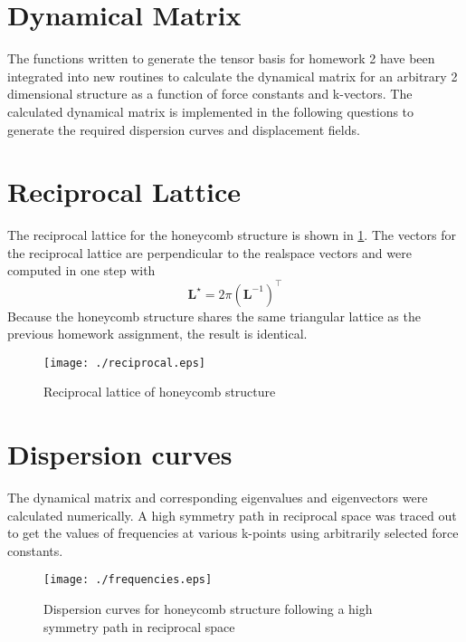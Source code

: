 \documentclass[12pt, fleqn]{article}
\begin{document}
\section{Dynamical Matrix}
The functions written to generate the tensor basis for homework 2 have been integrated into new routines to calculate the
dynamical matrix for an arbitrary 2 dimensional structure as a function of force constants and k-vectors.
The calculated dynamical matrix is implemented in the following questions to generate the required dispersion curves
and displacement fields.

\section{Reciprocal Lattice}
The reciprocal lattice for the honeycomb structure is shown in \cref{fig:reciprocal}. The vectors for the reciprocal lattice
are perpendicular to the realspace vectors and were computed in one step with
\begin{equation}
    \mathbf{L^\star}=2\pi \left( \mathbf{L}^{-1} \right)^{\intercal}
    \label{recip}
\end{equation}
Because the honeycomb structure shares the same triangular lattice as the previous homework assignment, the result is identical.

\begin{figure}[h]
    \begin{center}
        \texttt{[image: ./reciprocal.eps]}
    \end{center}
    \caption{Reciprocal lattice of honeycomb structure}
    \label{fig:reciprocal}
\end{figure}

\section{Dispersion curves}
The dynamical matrix and corresponding eigenvalues and eigenvectors were calculated numerically.
A high symmetry path in reciprocal space was traced out to get the values of frequencies at various k-points using arbitrarily selected force constants.

\begin{figure}[h]
    \begin{center}
        \texttt{[image: ./frequencies.eps]}
    \end{center}
    \caption{Dispersion curves for honeycomb structure following a high symmetry path in reciprocal space}
    \label{fig:dispersion}
\end{figure}
\end{document}

